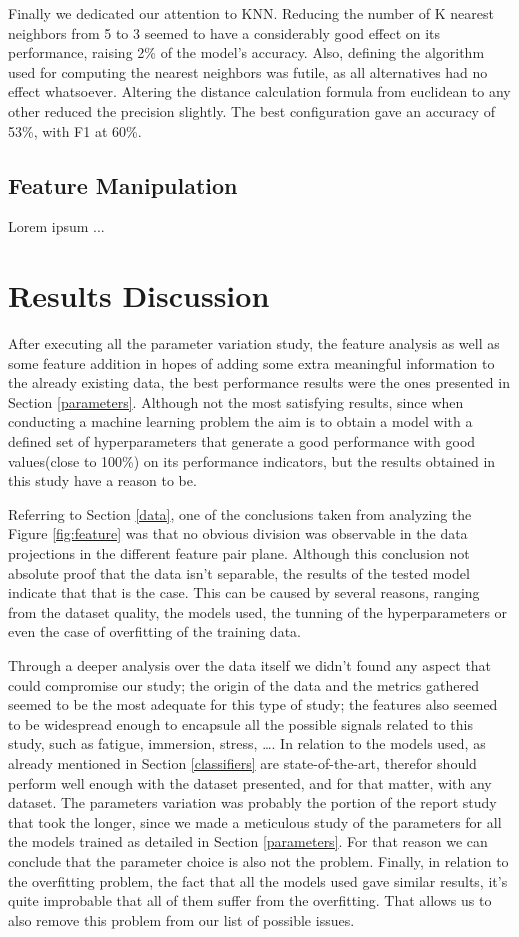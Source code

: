 \documentclass[conference]{IEEEtran}
\begin{document}
Finally we dedicated our attention to KNN.
Reducing the number of K nearest neighbors from 5 to 3 seemed to have a considerably
good effect on its performance, raising 2\% of the model's accuracy.
Also, defining the algorithm used for computing the nearest neighbors was futile,
as all alternatives had no effect whatsoever.
Altering the distance calculation formula from euclidean to any other reduced 
the precision slightly.
The best configuration gave an accuracy of 53\%, with F1 at 60\%.

\subsection{Feature Manipulation}

Lorem ipsum ...

\section{Results Discussion}
After executing all the parameter variation study, the feature analysis as well as some feature addition in hopes of adding some extra meaningful information to the already existing data, the best performance results were the ones presented in Section \ref{parameters}.
Although not the most satisfying results, since when conducting a machine learning problem the aim is to obtain a model with a defined set of hyperparameters that generate a good performance with good values(close to 100\%) on its performance indicators, but the results obtained in this study have a reason to be.

Referring to Section \ref{data}, one of the conclusions taken from analyzing the Figure \ref{fig:feature} was that no obvious division was observable in the data projections in the different feature pair plane. Although this conclusion not absolute proof that the data isn't separable, the results of the tested model indicate that that is the case. This can be caused by several reasons, ranging from the dataset quality, the models used, the tunning of the hyperparameters or even the case of overfitting of the training data. 

Through a deeper analysis over the data itself we didn't found any aspect that could compromise our study; the origin of the data and the metrics gathered seemed to be the most adequate for this type of study; the features also seemed to be widespread enough to encapsule all the possible signals related to this study, such as fatigue, immersion, stress, \dots. In relation to the models used, as already mentioned in Section \ref{classifiers} are state-of-the-art, therefor should perform well enough with the dataset presented, and for that matter, with any dataset. The parameters variation was probably the portion of the report study that took the longer, since we made a meticulous study of the parameters for all the models trained as detailed in Section \ref{parameters}. For that reason we can conclude that the parameter choice is also not the problem. Finally, in relation to the overfitting problem, the fact that all the models used gave similar results, it's quite improbable that all of them suffer from the overfitting. That allows us to also remove this problem from our list of possible issues.
\end{document}
